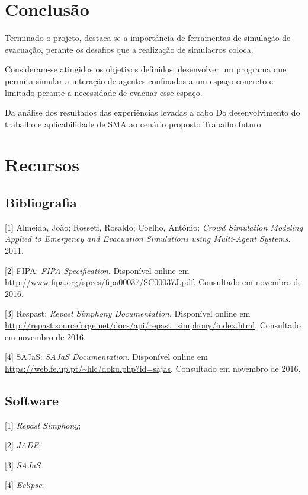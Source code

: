 \documentclass[12pt]{article}
\begin{document}
\begin{titlepage}
\newpage
\section{Conclusão}

Terminado o projeto, destaca-se a importância de ferramentas de simulação de evacuação, perante os desafios que a realização de simulacros coloca.

Consideram-se atingidos os objetivos definidos: desenvolver um programa que permita simular a interação de agentes confinados a um espaço concreto e limitado perante a necessidade de evacuar esse espaço.

Da análise dos resultados das experiências levadas a cabo
Do desenvolvimento do trabalho e aplicabilidade de SMA ao cenário proposto
Trabalho futuro



\section{Recursos}
\subsection{Bibliografia}
[1] Almeida, João; Rosseti, Rosaldo; Coelho, António: \textit{Crowd Simulation Modeling Applied to Emergency and Evacuation Simulations using Multi-Agent Systems}. 2011.

[2] FIPA: \textit{FIPA Specification}. Disponível online em \url{http://www.fipa.org/specs/fipa00037/SC00037J.pdf}. Consultado em novembro de 2016.

[3] Respast: \textit{Repast Simphony Documentation}. Disponível online em \url{http://repast.sourceforge.net/docs/api/repast_simphony/index.html}. Consultado em novembro de 2016.

[4] SAJaS: \textit{SAJaS Documentation}. Disponível online em \url{https://web.fe.up.pt/~hlc/doku.php?id=sajas}. Consultado em novembro de 2016.


\subsection{Software}
[1] \textit{Repast Simphony};

[2] \textit{JADE};

[3] \textit{SAJaS}.

[4] \textit{Eclipse};

\end{titlepage}
\end{document}
